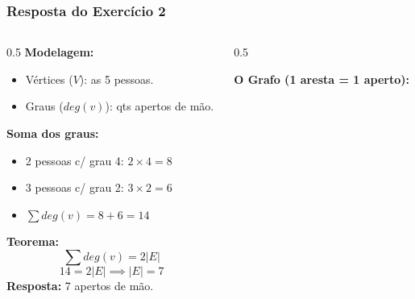 \documentclass[9pt]{beamer}
\begin{document}
\begin{frame}
    \frametitle{Resposta do Exercício 2}
    \begin{columns}
        \begin{column}{0.5\textwidth}
            \textbf{Modelagem:}
            \begin{itemize}
                \item Vértices ($V$): as 5 pessoas.
                \item Graus ($deg(v)$): qts apertos de mão.
            \end{itemize}
            \vspace{0.3cm}
            \textbf{Soma dos graus:}
            \begin{itemize}
                \item 2 pessoas c/ grau 4: $2 \times 4 = 8$
                \item 3 pessoas c/ grau 2: $3 \times 2 = 6$
                \item $\sum deg(v) = 8 + 6 = 14$
            \end{itemize}
            \vspace{0.3cm}
            \textbf{Teorema:}
            \[ \sum deg(v) = 2|E| \]
            \[ 14 = 2|E| \implies |E| = 7 \]
            \textbf{Resposta:} 7 apertos de mão.
        \end{column}
        \begin{column}{0.5\textwidth}
            \begin{center}
                \textbf{O Grafo (1 aresta = 1 aperto):}\\
                \vspace{0.2cm}
\end{center}
\end{column}
\end{columns}
\end{frame}
\end{document}
